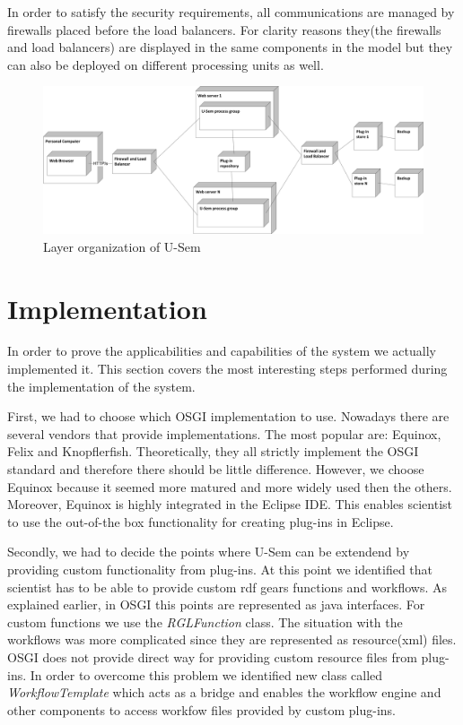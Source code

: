 In order to satisfy the security requirements, all communications are managed by firewalls placed before the load balancers. For clarity reasons they(the firewalls and load balancers) are displayed in the same components in the model but they can also be deployed on different processing units as well.


\begin{figure}[h!]
  \centering
  	\includegraphics[scale=0.70]{plug-in/layers/high_setup.png}
  \caption{Layer organization of U-Sem}
\end{figure}

\section{Implementation}

In order to prove the applicabilities and capabilities of the system we actually implemented it. This section covers the most interesting steps performed during the implementation of the system.

First, we had to choose which OSGI implementation to use. Nowadays there are several vendors that provide implementations. The most popular are: Equinox, Felix and Knopflerfish. Theoretically, they all strictly implement the OSGI standard and therefore there should be little difference. However, we choose Equinox because it seemed more matured and more widely used then the others. Moreover, Equinox is highly integrated in the Eclipse IDE. This enables scientist to use the out-of-the box functionality for creating plug-ins in Eclipse.

Secondly, we had to decide the points where U-Sem can be extendend by providing custom functionality from plug-ins. At this point we identified that scientist has to be able to provide custom rdf gears functions and workflows. As explained earlier, in OSGI this points are represented as java interfaces. For custom functions we use the \textit{RGLFunction} class. The situation with the workflows was more complicated since they are represented as resource(xml) files. OSGI does not provide direct way for providing custom resource files from plug-ins. In order to overcome this problem we identified new class called \textit{WorkflowTemplate} which acts as a bridge and enables the workflow engine and other components to access workfow files provided by custom plug-ins.

